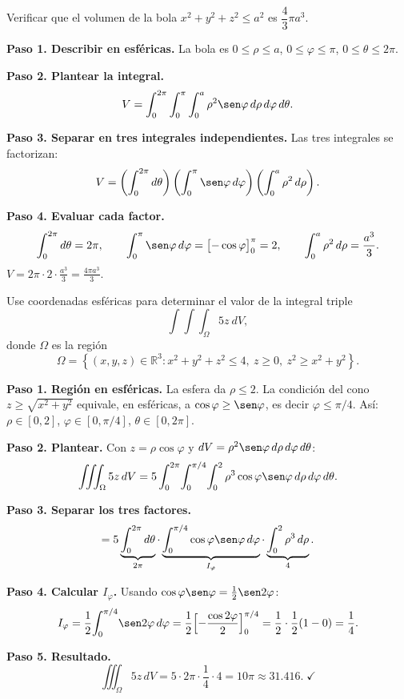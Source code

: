\begin{example}
Verificar que el volumen de la bola $x^2+y^2+z^2\le a^2$ es $\dfrac{4}{3}\pi a^3$.
\begin{myproof}
\textbf{Paso 1. Describir en esféricas.} La bola es $0\le\rho\le a$, $0\le\varphi\le\pi$, $0\le\theta\le2\pi$.

\textbf{Paso 2. Plantear la integral.}
\[
V = \int_{0}^{2\pi}\int_{0}^{\pi}\int_{0}^{a}\rho^2\sen\varphi\,d\rho\,d\varphi\,d\theta.
\]

\textbf{Paso 3. Separar en tres integrales independientes.} Las tres integrales se factorizan:
\[
V = \left(\int_{0}^{2\pi}d\theta\right)\left(\int_{0}^{\pi}\sen\varphi\,d\varphi\right)\left(\int_{0}^{a}\rho^2\,d\rho\right).
\]

\textbf{Paso 4. Evaluar cada factor.}
\[
\int_{0}^{2\pi}d\theta = 2\pi,\qquad
\int_{0}^{\pi}\sen\varphi\,d\varphi = \bigl[-\cos\varphi\bigr]_{0}^{\pi} = 2,\qquad
\int_{0}^{a}\rho^2\,d\rho = \frac{a^3}{3}.
\]
$\displaystyle\boxed{V = 2\pi\cdot 2\cdot \frac{a^3}{3} = \frac{4\pi a^3}{3}}$.
\end{myproof}
\end{example}

\begin{prob}
Use coordenadas esféricas para determinar el valor de la integral triple $$\displaystyle\int\int\int_{\Omega}5z\  dV,$$ donde $\Omega$ es la región $$\Omega=\left\lbrace (x,y,z)\in \mathbb{R}^3 : x^2+y^2+z^2 \leq 4,\ z\geq 0,\ z^2\geq x^2+y^2 \right\rbrace.$$
\begin{myproof}
\textbf{Paso 1. Región en esféricas.} La esfera da $\rho\le2$. La condición del cono $z\ge\sqrt{x^2+y^2}$ equivale, en esféricas, a $\cos\varphi\ge\sen\varphi$, es decir $\varphi\le\pi/4$. Así: $\rho\in[0,2]$, $\varphi\in[0,\pi/4]$, $\theta\in[0,2\pi]$.

\textbf{Paso 2. Plantear.} Con $z=\rho\cos\varphi$ y $dV=\rho^2\sen\varphi\,d\rho\,d\varphi\,d\theta$:
\[
\iiint_\Omega 5z\,dV
= 5\int_0^{2\pi}\!\int_0^{\pi/4}\!\int_0^2
  \rho^3\cos\varphi\sen\varphi\,d\rho\,d\varphi\,d\theta.
\]

\textbf{Paso 3. Separar los tres factores.}
\[
= 5\underbrace{\int_0^{2\pi}d\theta}_{2\pi}
  \cdot\underbrace{\int_0^{\pi/4}\cos\varphi\sen\varphi\,d\varphi}_{I_\varphi}
  \cdot\underbrace{\int_0^2\rho^3\,d\rho}_{4}.
\]

\textbf{Paso 4. Calcular $I_\varphi$.} Usando $\cos\varphi\sen\varphi=\frac12\sen2\varphi$:
\[
I_\varphi = \frac12\!\int_0^{\pi/4}\!\sen2\varphi\,d\varphi
= \frac12\Bigl[-\frac{\cos2\varphi}{2}\Bigr]_0^{\pi/4}
= \frac12\cdot\frac12(1-0) = \frac14.
\]

\textbf{Paso 5. Resultado.}
\[
\iiint_\Omega 5z\,dV
= 5\cdot2\pi\cdot\frac14\cdot4 = \boxed{10\pi}\approx 31.416.\;
\checkmark
\]
\end{myproof}
\end{prob}


